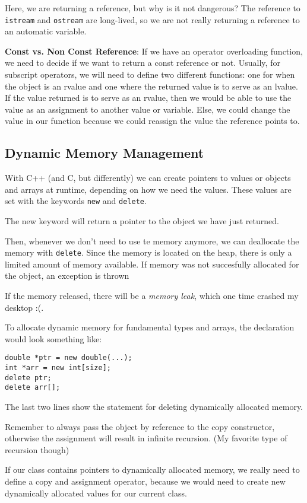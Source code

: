 \documentclass{article}
\begin{document}
Here, we are returning a reference, but why is it not dangerous? The reference to \texttt{istream} and 
\texttt{ostream} are long-lived, so we are not really returning a reference to an automatic variable.

\textbf{Const vs. Non Const Reference}: If we have an operator overloading function, we need to decide if 
we want to return a const reference or not. Usually, for subscript operators, we will need to define 
two different functions: one for when the object is an rvalue and one where the returned value is to 
serve as an lvalue. If the value returned is to serve as an rvalue, then we would be able to use the value 
as an assignment to another value or variable. Else, we could change the value in our function because
we could reassign the value the reference points to.
\subsection{Dynamic Memory Management}
With C++ (and C, but differently) we can create pointers to values or objects and arrays at runtime, depending 
on how we need the values. These values are set with the keywords \texttt{new} and \texttt{delete}. 

The new keyword will return a pointer to the object we have just returned.

Then, whenever we don't need to use te memory anymore, we can deallocate the memory with \texttt{delete}. 
Since the memory is located on the heap, there is only a limited amount of memory available. If memory
was not succesfully allocated for the object, an exception is thrown

If the memory released, there will be a \textit{memory leak}, which one time crashed my desktop :(.

To allocate dynamic memory for fundamental types and arrays, the declaration would look something like: 
\begin{verbatim}
double *ptr = new double(...);
int *arr = new int[size];
delete ptr;
delete arr[];
\end{verbatim}
The last two lines show the statement for deleting dynamically allocated memory.

Remember to always pass the object by reference to the copy constructor, otherwise the assignment will result
in infinite recursion. (My favorite type of recursion though)

If our class contains pointers to dynamically allocated memory, we really need to define a copy and 
assignment operator, because we would need to create new dynamically allocated values for our current class. 
\end{document}
